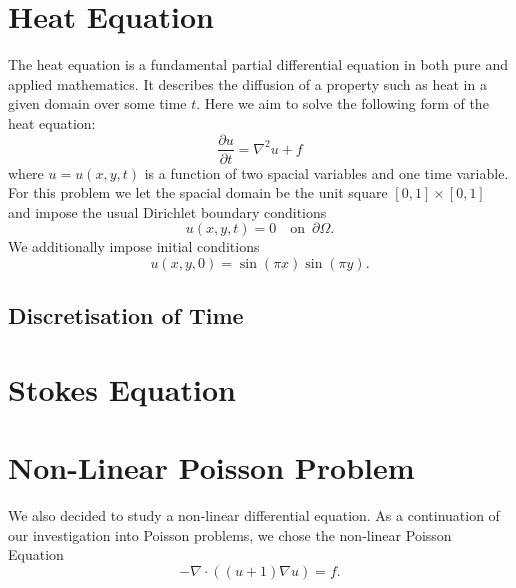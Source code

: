 \documentclass{article}
\begin{document}
\section{Heat Equation}
The heat equation is a fundamental partial differential equation in both pure and applied mathematics. It describes the diffusion of a property such as heat in a given domain over some time $t$. Here we aim to solve the following form of the heat equation:
$$\frac{\partial u}{\partial t} = \nabla^2u + f$$
where $u = u(x,y,t)$ is a function of two spacial variables and one time variable. For this problem we let the spacial domain be the unit square $[0,1]\times[0,1]$ and impose the usual Dirichlet boundary conditions
$$u(x,y,t) = 0 \quad \textrm{on } \,\partial\Omega. $$
We additionally impose initial conditions
$$u(x,y,0) = \sin{(\pi x)}\sin{(\pi y)}.$$
\subsection{Discretisation of Time}



\section{Stokes Equation}
\section{Non-Linear Poisson Problem}
We also decided to study a non-linear differential equation. As a continuation of our investigation into Poisson problems, we chose the non-linear Poisson Equation  $$-\nabla \cdot((u+1)\nabla u) = f.$$
\end{document}
